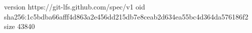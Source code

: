 version https://git-lfs.github.com/spec/v1
oid sha256:1c5bdba66afff4d863a2e456dd215db7e8ceab2d634ea55bc4d364da576186f2
size 43840
